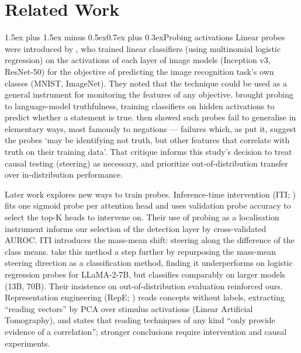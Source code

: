 \documentclass[conference]{IEEEtran}
\makeatletter
\renewcommand{\paragraph}{\@startsection{paragraph}{4}{2em}%
  {1.5ex plus 1.5ex minus 0.5ex}{0.7ex plus 0.3ex}{\normalfont\normalsize\itshape}}
\makeatother
\begin{document}
\section{Related Work}
\label{sec:related}

\paragraph{Probing activations}
Linear probes were introduced by \citet{alain2018}, who trained linear
classifiers (using multinomial logistic regression) on the activations of each
layer of image models (Inception v3, ResNet-50) for the objective of predicting
the image recognition task's own classes (MNIST, ImageNet). They noted
that the technique could be used as a general instrument for monitoring the
features of any objective. \citet{azaria2023} brought probing to language-model
truthfulness, training classifiers on hidden activations to predict whether a
statement is true. \citet{levinstein2024} then showed such probes fail to
generalise in elementary ways, most famously to negations --- failures which,
as \citet{marks2024} put it, suggest the probes `may be identifying not truth,
but other features that correlate with truth on their training data'. That
critique informs this study's decision to treat causal testing (steering) as
necessary, and prioritize out-of-distribution transfer over in-distribution
performance.

Later work explores new ways to train probes. Inference-time intervention (ITI;
\citealt{li2023}) fits one sigmoid probe per attention head and uses validation
probe accuracy to select the top-K heads to intervene on. Their use of probing
as a localisation instrument informs our selection of the detection layer by
cross-validated AUROC. ITI introduces the mass-mean shift: steering along the
difference of the class means. \citet{marks2024} take this method a step
further by repurposing the mass-mean steering direction as a classification
method, finding it underperforms on logistic regression probes for LLaMA-2-7B,
but classifies comparably on larger models (13B, 70B). Their insistence on
out-of-distribution evaluation reinforced ours. Representation engineering
(RepE; \citealt{zou2023}) reads concepts without labels, extracting ``reading
vectors'' by PCA over stimulus activations (Linear Artificial Tomography), and
states that reading techniques of any kind ``only provide evidence of a
correlation''; stronger conclusions require intervention and causal
experiments.
\end{document}
